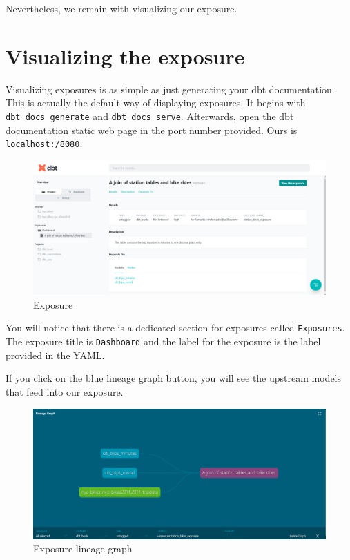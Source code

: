 \documentclass[
]{book}
\begin{document}
Nevertheless, we remain with visualizing our exposure.

\hypertarget{visualizing-the-exposure}{%
\section{Visualizing the exposure}\label{visualizing-the-exposure}}

Visualizing exposures is as simple as just generating your dbt documentation. This is actually the default way of displaying exposures. It begins with \texttt{dbt\ docs\ generate} and \texttt{dbt\ docs\ serve}. Afterwards, open the dbt documentation static web page in the port number provided. Ours is \texttt{localhost:/8080}.

\begin{figure}
\centering
\includegraphics{./images/exposure_webpage.png}
\caption{Exposure}
\end{figure}

You will notice that there is a dedicated section for exposures called \texttt{Exposures}. The exposure title is \texttt{Dashboard} and the label for the exposure is the label provided in the YAML.

If you click on the blue lineage graph button, you will see the upstream models that feed into our exposure.

\begin{figure}
\centering
\includegraphics{./images/exposure_lineage_graph.png}
\caption{Exposure lineage graph}
\end{figure}
\end{document}
